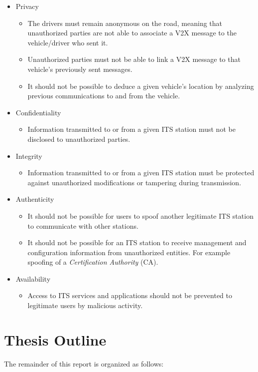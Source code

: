 \begin{itemize}
	\item Privacy
	\begin{itemize}
		\item The drivers must remain anonymous on the road, meaning that unauthorized parties are not able to associate a V2X message to the vehicle/driver who sent it.
		
		\item Unauthorized parties must not be able to link a V2X message to that vehicle's previously sent messages.
		
		\item It should not be possible to deduce a given vehicle's location by analyzing previous communications to and from the vehicle.
	\end{itemize}
	
	\item Confidentiality
	\begin{itemize}
		\item Information transmitted to or from a given ITS station must not be disclosed to unauthorized parties.
		
	\end{itemize}
	
	\item Integrity
	\begin{itemize}
		\item Information transmitted to or from a given ITS station must be protected against unauthorized modifications or tampering during transmission. 
	\end{itemize}
	
	\item Authenticity
	\begin{itemize}
		\item It should not be possible for users to spoof another legitimate ITS station to communicate with other stations.
		
		\item It should not be possible for an ITS station to receive management and configuration information from unauthorized entities. For example spoofing of a \textit{Certification Authority} (CA).
	\end{itemize}
	\item Availability
	\begin{itemize}
		\item Access to ITS services and applications should not be prevented to legitimate users by malicious activity. 
	\end{itemize}
\end{itemize}


\section{Thesis Outline}
\label{section:outline}

The remainder of this report is organized as follows:


